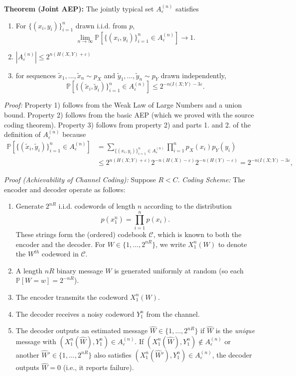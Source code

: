 \documentclass[twoside]{article}
\newcommand\pr{\mathbb{P}}      %
\newcommand\e{\varepsilon}
\renewcommand\hat{\widehat}
\begin{document}
{\bf Theorem (Joint AEP):} The jointly typical set $A_\e^{(n)}$ satisfies
\begin{enumerate}[1)]
\item For $\{(x_i,y_i)\}_{i = 1}^n$ drawn i.i.d. from $p$,
\[\lim_{n \to \infty} \pr[\{(x_i,y_i)\}_{i = 1}^n \in A_\e^{(n)}] \to 1.\]
\item $|A_\e^{(n)}| \leq 2^{n(H(X,Y) + \e)}$
\item for sequences $\tilde x_1,\dots,\tilde x_n \sim p_X$ and
$\tilde y_1,\dots,\tilde y_n \sim p_Y$ drawn independently,
\[\pr\left[ \{(\tilde x_i,\tilde y_i)\}_{i = 1}^n \in A_\e^{(n)} \right]
    \leq 2^{-n(I(X;Y) - 3\e}.\]
\end{enumerate}

\emph{Proof:} Property 1) follows from the Weak Law of Large Numbers and a
union bound. Property 2) follows from the basic AEP (which we proved with the
source coding theorem). Property 3) follows from property 2) and parts 1. and
2. of the definition of $A_\e^{(n)}$ because
\begin{align*}
\pr\left[ \{(\tilde x_i, \tilde y_i)\}_{i = 1}^n \in A_\e^{(n)} \right]
 &  = \sum_{\{(x_i,y_i)\}_{i = 1}^n \in A_\e^{(n)}}
                                            \prod_{i = 1}^n p_X(x_i)p_Y(y_i) \\
 &  \leq 2^{n(H(X;Y) + \e)}2^{-n(H(X) - \e)}2^{-n(H(Y) - \e)}
    = 2^{-n(I(X;Y) - 3\e},
\end{align*}

\emph{Proof (Achievability of Channel Coding):} Suppose $R < C$.
\emph{Coding Scheme:}
The encoder and decoder operate as follows:
\begin{enumerate}
\item Generate $2^{nR}$ i.i.d. codewords of length $n$ according to the
distribution
\[p(x_1^n) = \prod_{i = 1}^n p(x_i).\]
These strings form the (ordered) codebook $\mathcal{C}$, which is known to both
the encoder and the decoder. For $W \in \{1,\dots,2^{nR}\}$, we write
$X_1^n(W)$ to denote the $W^{th}$ codeword in $\mathcal{C}$.
\item A length $nR$ binary message $W$ is generated uniformly at random (so
each $\pr\left[ W = w \right] = 2^{-nR}$).
\item The encoder transmits the codeword $X_1^n(W)$.
\item The decoder receives a noisy codeword $Y_1^n$ from the channel.
\item The decoder outputs an estimated message $\hat W \in \{1,\dots,2^{nR}\}$
if $\hat W$ is the \emph{unique} message with
$(X_1^n(\hat W), Y_1^n) \in A_\e^{(n)}$. If
$(X_1^n(\hat W), Y_1^n) \not\in A_\e^{(n)}$ or another
$\hat W' \in \{1,\dots,2^{nR}\}$ also satisfies
$(X_1^n(\hat W'), Y_1^n) \in A_\e^{(n)}$, the decoder outputs $\hat W = 0$
(i.e., it reports failure).
\end{enumerate}
\end{document}
